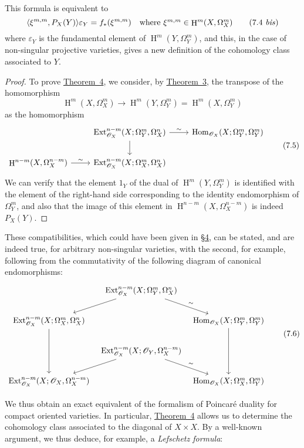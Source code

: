 \documentclass{article}
\newcommand{\scr}[1]{{\mathscr{#1}}}
\DeclareMathOperator{\Ext}{Ext}
\DeclareMathOperator{\Hom}{Hom}
\DeclareMathOperator{\HH}{H}
\newcommand{\oldpage}[1]{\marginpar{\footnotesize$\Big\vert$ \textit{p.~#1}}}
\begin{document}
This formula is equivalent to
\[
\label{7.4bis}
  \langle \xi^{m,m}, P_X(Y) \rangle \varepsilon_Y
  = f_*(\xi^{m,m})
  \quad\mbox{where $\xi^{m,m}\in\HH^m(X,\Omega_X^m)$}
\tag{7.4~\emph{bis}}
\]
where $\varepsilon_Y$ is the fundamental element of $\HH^m(Y,\Omega_Y^m)$, and this, in the case of non-singular projective varieties, gives a new definition of the cohomology class associated to $Y$.

\begin{proof}
  To prove \hyperref[theorem4]{Theorem~4}, we consider, by \hyperref[theorem3]{Theorem~3}, the transpose of the homomorphism
  \[
    \HH^m(X,\Omega_X^m) \to \HH^m(Y,\Omega_Y^m) = \HH^m(X,\Omega_Y^m)
  \]
  as the homomorphism
  \[
  \label{7.5}
    \begin{tikzcd}
      &\Ext_{\scr{O}_X}^{n-m}(X;\Omega_Y^m,\Omega_X^n)
        \rar["\sim"] \dar
      &\Hom_{\scr{O}_X}(X;\Omega_Y^m,\Omega_Y^m)
    \\
      \HH^{n-m}(X,\Omega_X^{n-m})
        \rar["\sim"]
      &\Ext_{\scr{O}_X}^{n-m}(X;\Omega_X^m,\Omega_X^n)
      &
    \end{tikzcd}
  \tag{7.5}
  \]
  We can verify that the element $1_Y$ of the dual of $\HH^m(Y,\Omega_Y^m)$ is identified with the element of the right-hand side corresponding to the identity endomorphism of $\Omega_Y^m$, and also that the image of this element in $\HH^{n-m}(X,\Omega_X^{n-m})$ is indeed $P_X(Y)$.
\end{proof}

These compatibilities, which could have been given in \hyperref[section4]{\S4}, can be stated, and are indeed true, for arbitrary non-singular varieties, with the second,
\oldpage{149-21}
for example, following from the commutativity of the following diagram of canonical endomorphisms:
\[
\label{7.6}
  \begin{tikzcd}[column sep=tiny]
    & \Ext_{\scr{O}_X}^{n-m}(X;\Omega_Y^m,\Omega_X^n)
      \ar[ld] \ar[dr,"\sim"]
    &
  \\\Ext_{\scr{O}_X}^{n-m}(X;\Omega_X^m,\Omega_X^n)
      \ar[dd]
    && \Hom_{\scr{O}_X}(X;\Omega_Y^m,\Omega_Y^m)
      \ar[dd]
  \\& \Ext_{\scr{O}_X}^{n-m}(X;\scr{O}_Y,\Omega_X^{n-m})
      \ar[ld] \ar[dr,"\sim"]
    &
  \\\Ext_{\scr{O}_X}^{n-m}(X;\scr{O}_X,\Omega_X^{n-m})
    && \Hom_{\scr{O}_X}(X;\Omega_X^m,\Omega_Y^m)
  \end{tikzcd}
\tag{7.6}
\]

We thus obtain an exact equivalent of the formalism of Poincar\'{e} duality for compact oriented varieties.
In particular, \hyperref[theorem4]{Theorem~4} allows us to determine the cohomology class associated to the diagonal of $X\times X$.
By a well-known argument, we thus deduce, for example, a \emph{Lefschetz formula}:
\end{document}

